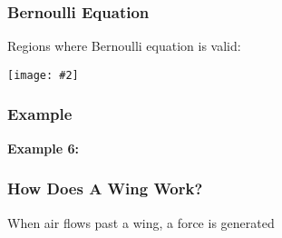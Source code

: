 \documentclass[12pt,aspectratio=169]{beamer}
\newcommand{\pic}[2]{\texttt{[image: \#2]}}
\newcommand{\mb}[1]{\mathbf{#1}}
\newcommand{\eq}[2]{\vspace{#1}{\Large\begin{displaymath}#2\end{displaymath}}}
\begin{document}
%
%    
%
%
%
%
%
%
%



\begin{frame}
  \frametitle{Bernoulli Equation}

  Regions where Bernoulli equation is valid:
  \begin{center}
    \pic{.8}{bernoulli.jpg}
  \end{center}
\end{frame}



\begin{frame}
  \frametitle{Example}

  \textbf{Example 6:}
\end{frame}



\begin{frame}
  \frametitle{How Does A Wing Work?}

  When air flows past a wing, a force is generated
\end{frame}
\end{document}
